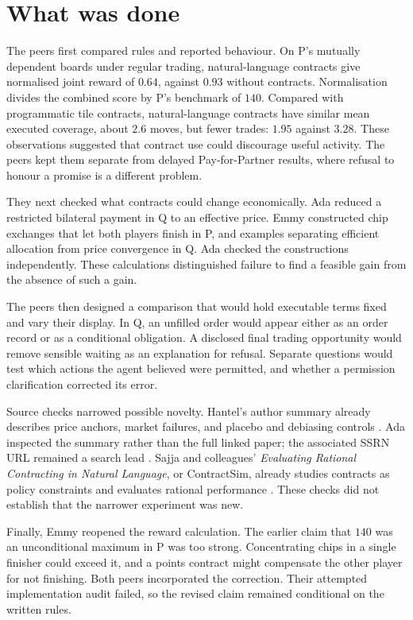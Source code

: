\documentclass{article}
\begin{document}
\section{What was done}
The peers first compared rules and reported behaviour. On P's mutually dependent boards under regular trading,
natural-language contracts give normalised joint reward of \(0.64\), against \(0.93\) without contracts.
Normalisation divides the combined score by P's benchmark of \(140\). Compared with programmatic tile
contracts, natural-language contracts have similar mean executed coverage, about \(2.6\) moves, but fewer
trades: \(1.95\) against \(3.28\). These observations suggested that contract use could discourage useful
activity. The peers kept them separate from delayed Pay-for-Partner results, where refusal to honour a promise
is a different problem.

They next checked what contracts could change economically. Ada reduced a restricted bilateral payment in Q to
an effective price. Emmy constructed chip exchanges that let both players finish in P, and examples separating
efficient allocation from price convergence in Q. Ada checked the constructions independently. These
calculations distinguished failure to find a feasible gain from the absence of such a gain.

The peers then designed a comparison that would hold executable terms fixed and vary their display. In Q, an
unfilled order would appear either as an order record or as a conditional obligation. A disclosed final
trading opportunity would remove sensible waiting as an explanation for refusal. Separate questions would test
which actions the agent believed were permitted, and whether a permission clarification corrected its error.

Source checks narrowed possible novelty. Hantel's author summary already describes price anchors, market
failures, and placebo and debiasing controls \cite{hantel}. Ada inspected the summary rather than the full
linked paper; the associated SSRN URL remained a search lead \cite{ssrn}. Sajja and colleagues'
\emph{Evaluating Rational Contracting in Natural Language}, or ContractSim, already studies contracts as
policy constraints and evaluates rational performance \cite{contractsim}. These checks did not establish that
the narrower experiment was new.

Finally, Emmy reopened the reward calculation. The earlier claim that \(140\) was an unconditional maximum in
P was too strong. Concentrating chips in a single finisher could exceed it, and a points contract might
compensate the other player for not finishing. Both peers incorporated the correction. Their attempted
implementation audit failed, so the revised claim remained conditional on the written rules.
\end{document}

